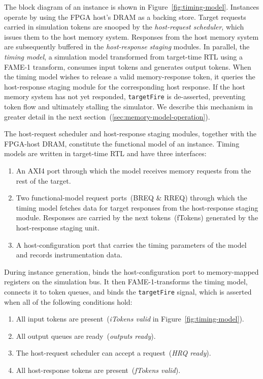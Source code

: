The block diagram of an instance is shown in Figure~\ref{fig:timing-model}.
Instances operate by using the FPGA host's DRAM as a backing store.  Target
requests carried in simulation tokens are snooped by the \emph{host-request
scheduler}, which issues them to the host memory system.  Responses from the
host memory system are subsequently buffered in the \emph{host-response
staging} modules. In parallel, the \emph{timing model}, a simulation model
transformed from target-time RTL using a FAME-1 transform, consumes input
tokens and generates output tokens. When the timing model wishes to release a
valid memory-response token, it queries the host-response staging module for
the corresponding host response. If the host memory system has not yet responded,
\texttt{targetFire} is de-asserted, preventing token flow and
ultimately stalling the simulator. We describe this mechanism in greater detail in
the next section~(\ref{sec:memory-model-operation}).

The host-request scheduler and host-response staging modules, together with the
FPGA-host DRAM, constitute the functional model of an instance.  Timing models
are written in target-time RTL and have three interfaces:

\begin{enumerate}
    \item An AXI4 port through which the model receives memory requests from the rest of the target.
    \item Two functional-model request ports~(BREQ \& RREQ) through which the
        timing model fetches data for target responses from the host-response
        staging module. Responses are carried by the next tokens~(fTokens)
        generated by the host-response staging unit.
    \item A host-configuration port that carries the timing parameters of the
        model and records instrumentation data.
\end{enumerate}

During instance generation, \PNAME binds the host-configuration port to memory-mapped
registers on the simulation bus. It then FAME-1-transforms the timing model, connects it to
token queues, and binds the \texttt{targetFire} signal, which is asserted when all of the following
conditions hold:

\begin{enumerate}
    \item All input tokens are present~(\textit{iTokens valid} in Figure~\ref{fig:timing-model}).
    \item All output queues are ready~(\textit{outputs ready}).
    \item The host-request scheduler can accept a request~(\textit{HRQ ready}).
    \item All host-response tokens are present~(\textit{fTokens valid}).
    \vspace{-0.05in}
\end{enumerate}

